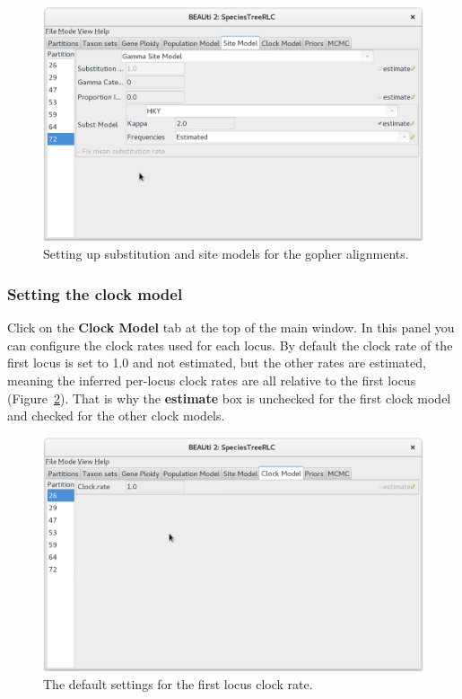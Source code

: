 \documentclass{article}
\begin{document}
\begin{figure}[htb!]
\centering
\includegraphics[width=\textwidth]{figures/beauti-subst.png}
\caption{Setting up substitution and site models for the gopher alignments.}
\label{fig:HKY}
\end{figure}

\subsubsection*{Setting the clock model}

Click on the \textbf{Clock Model} tab at the top of the main window. In
this panel you can configure the clock rates used for each locus. By default the
clock rate of the first locus is set to 1.0 and not estimated, but the other
rates are estimated, meaning the inferred per-locus clock rates are all
relative to the first locus (Figure~\ref{fig:clock}). That is why the
\textbf{estimate} box is unchecked for the first clock model and checked
for the other clock models.

\begin{figure}[htb!]
\centering
\includegraphics[width=\textwidth]{figures/beauti-clock.png}
\caption{The default settings for the first locus clock rate.}
\label{fig:clock}
\end{figure}
\end{document}
